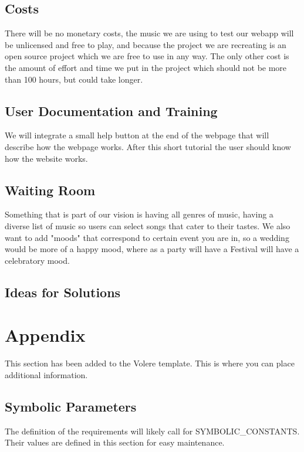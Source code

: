\documentclass[12pt, titlepage]{article}
\begin{document}
\subsection{Costs}

There will be no monetary costs, the music we are using to test our webapp will be unlicensed and free to play, and because the project we are recreating is an open source project which we are free to use in any way. The only other cost is the amount of effort and time we put in the project which should not be more than 100 hours, but could take longer.

\subsection{User Documentation and Training}

We will integrate a small help button at the end of the webpage that will describe how the webpage works. After this short tutorial the user should know how the website works.

\subsection{Waiting Room}

Something that is part of our vision is having all genres of music, having a diverse list of music so users can select songs that cater to their tastes. We also want to add "moods" that correspond to certain event you are in, so a wedding would be more of a happy mood, where as a party will have a Festival will have a celebratory mood.

\subsection{Ideas for Solutions}

\newpage





\newpage

\section{Appendix}

This section has been added to the Volere template.  This is where you can place
additional information.

\subsection{Symbolic Parameters}

The definition of the requirements will likely call for SYMBOLIC\_CONSTANTS.
Their values are defined in this section for easy maintenance.
\end{document}
